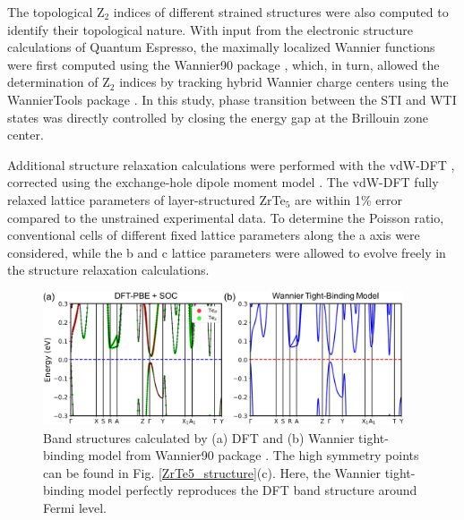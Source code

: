 The topological Z$_2$ indices of different strained structures were also computed to identify their topological nature. With input from the electronic structure calculations of Quantum Espresso, the maximally localized Wannier functions were first computed using the Wannier90 package \cite{wannier90}, which, in turn, allowed the determination of Z$_2$ indices by tracking hybrid Wannier charge centers using the WannierTools package \cite{wanniertools}. In this study, phase transition between the STI and WTI states was directly controlled by closing the energy gap at the Brillouin zone center.

Additional structure relaxation calculations were performed with the vdW-DFT \cite{thonhauser2007van,berland2015van}, corrected using the exchange-hole dipole moment model \cite{otero2012van}. The vdW-DFT fully relaxed lattice parameters of layer-structured ZrTe$_5$ are within 1\% error compared to the unstrained experimental data. To determine the Poisson ratio, conventional cells of different fixed lattice parameters along the a axis were considered, while the b and c lattice parameters were allowed to evolve freely in the structure relaxation calculations.

	\begin{figure}[htbp]
        \centering
        \captionsetup{singlelinecheck = false, justification=justified}
        \includegraphics[width=0.95\textwidth]{ZrTe5_bands.png}
        \caption[Band structures calculated by DFT and tight-binding model.]{Band structures calculated by (a) DFT and (b) Wannier tight-binding model from Wannier90 package \cite{wannier90}. The high symmetry points can be found in Fig. \ref{ZrTe5_structure}(c). Here, the Wannier tight-binding model perfectly reproduces the DFT band structure around Fermi level.}
        \label{ZrTe5_bands}
    \end{figure}

